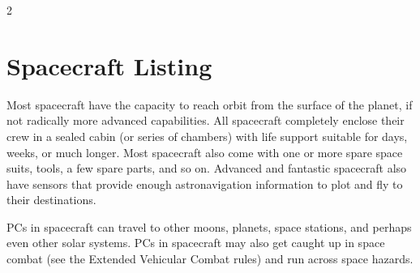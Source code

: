 \begin{multicols}{2}
\section{Spacecraft Listing}

Most spacecraft have the capacity to reach orbit from the surface of the planet, if not radically more advanced capabilities. All spacecraft completely enclose their crew in a sealed cabin (or series of chambers) with life support suitable for days, weeks, or much longer. Most spacecraft also come with one or more spare space suits, tools, a few spare parts, and so on. Advanced and fantastic spacecraft also have sensors that provide enough astronavigation information to plot and fly to their destinations. 

PCs in spacecraft can travel to other moons, planets, space stations, and perhaps even other solar systems. PCs in spacecraft may also get caught up in space combat (see the Extended Vehicular Combat rules) and run across space hazards.

\end{multicols}


